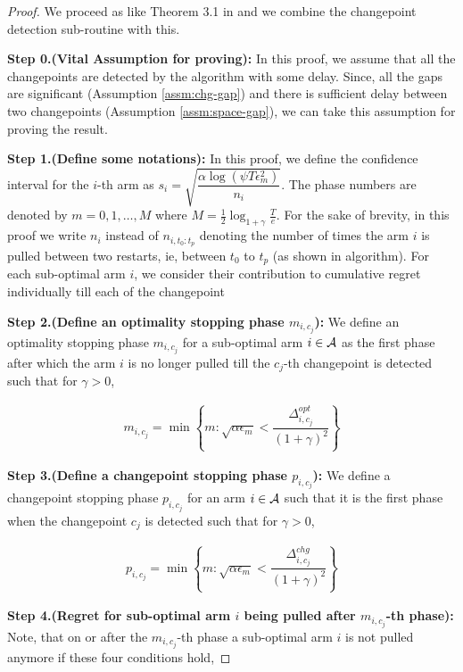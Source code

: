\begin{proof}

We proceed as like Theorem 3.1 in \citet{auer2010ucb} and we combine the changepoint detection sub-routine with this. 

\textbf{Step 0.(Vital Assumption for proving):} In this proof, we assume that all the changepoints are detected by the algorithm with some delay. Since, all the gaps are significant (Assumption \ref{assm:chg-gap}) and there is sufficient delay between two changepoints (Assumption \ref{assm:space-gap}), we can take this assumption for proving the result.

\textbf{Step 1.(Define some notations):} In this proof, we define the confidence interval for the $i$-th arm as $s_i=\sqrt{\dfrac{\alpha\log(\psi T\epsilon_m^2)}{n_{i}}}$. The phase numbers are denoted by $m=0,1,\ldots,M$ where $M=\frac{1}{2}\log_{1+\gamma}\frac{T}{e}$. For the sake of brevity, in this proof we write $n_i$ instead of $n_{i,t_0:t_p}$ denoting the number of times the arm $i$ is pulled between two restarts, ie, between $t_0$ to $t_p$ (as shown in algorithm). For each sub-optimal arm $i$, we consider their contribution to cumulative regret individually till each of the changepoint 

\textbf{Step 2.(Define an optimality stopping phase $m_{i,c_j}$):} We define an optimality stopping phase $m_{i,c_j}$ for a sub-optimal arm $i\in\mathcal{A}$ as the first phase after which the arm $i$ is no longer pulled till the $c_j$-th changepoint is detected such that for $\gamma>0$,

\begin{align*}
m_{i,c_j} = \min\left\lbrace m: \sqrt{\alpha\epsilon_{m}} < \dfrac{\Delta^{opt}_{i,c_j}}{(1+\gamma)^2} \right\rbrace
\end{align*} 

\textbf{Step 3.(Define a changepoint stopping phase $p_{i,c_j}$):} We define a changepoint stopping phase $p_{i,c_j}$ for an arm $i\in\mathcal{A}$ such that it is the first phase when the changepoint $c_j$ is detected such that for $\gamma > 0$,

\begin{align*}
p_{i,c_j} = \min\left\lbrace m: \sqrt{\alpha\epsilon_{m}} < \dfrac{\Delta^{chg}_{i,c_j}}{(1+\gamma)^2} \right\rbrace
\end{align*}

\textbf{Step 4.(Regret for sub-optimal arm $i$ being pulled after $m_{i,c_j}$-th phase):} Note, that on or after the $m_{i,c_j}$-th phase a sub-optimal arm $i$ is not pulled anymore if these four conditions hold,


\end{proof}
